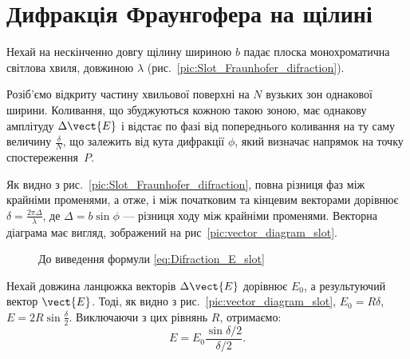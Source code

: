 \section{Дифракція Фраунгофера на щілині}

Нехай на нескінченно довгу щілину шириною $ b $ падає плоска монохроматична світлова хвиля, довжиною $ \lambda $  (рис.~\ref{pic:Slot_Fraunhofer_difraction}).




Розіб'ємо відкриту частину хвильової поверхні на $  N $ вузьких зон однакової ширини. Коливання, що збуджуються кожною такою зоною, має однакову амплітуду $ \Delta \vect{E} $ і відстає по фазі від попереднього коливання на ту саму величину $ \frac{\delta}{N} $, що залежить від кута дифракції $ \phi $, який визначає напрямок на точку спостереження~$ P $.




Як видно з рис.~\ref{pic:Slot_Fraunhofer_difraction}, повна різниця фаз між крайніми променями, а отже, і між початковим та кінцевим векторами дорівнює $ \delta = \frac{2\pi \Delta}{\lambda} $, де $ \Delta = b\sin\phi $ --- різниця ходу між крайніми променями. Векторна діаграма має вигляд, зображений на рис~\ref{pic:vector_diagram_slot}.

\begin{figure}[h!]\centering
    
    \caption{До виведення формули \eqref{eq:Difraction_E_slot}}
\end{figure}



Нехай довжина ланцюжка векторів $ \Delta \vect{E} $ дорівнює $ E_0 $, а результуючий вектор $ \vect{E} $. Тоді, як видно з рис.~\ref{pic:vector_diagram_slot}, $ E_0 = R\delta $, $ E = 2R\sin\frac\delta2 $. Виключаючи з цих рівнянь $ R $, отримаємо:
\begin{equation}\label{eq:Difraction_E_slot}
    E = E_0 \frac{\sin\delta/2}{\delta/2}.
\end{equation}

